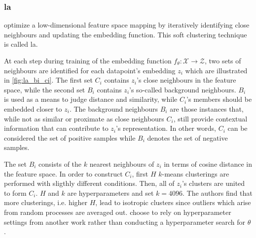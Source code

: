 \subsubsection{\acl{la}}\label{subsec:local_aggregation}


\citet{local_aggr_2019} optimize a low-dimensional feature space mapping by 
iteratively identifying close neighbours and updating the embedding function.
This soft clustering technique is called \ac{la}.

At each step during training of the embedding function $f_\theta: \mathcal{X} \rightarrow \mathcal{Z}$, 
two sets of neighbours are identified for each datapoint's embedding $z_i$ 
which are illustrated in \autoref{fig:la_bi_ci}.
The first set $C_i$ contains $z_i$'s close neighbours in the feature space, while
the second set $B_i$ contains $z_i$'s so-called background neighbours.
$B_i$ is used as a means to judge distance and similarity, 
while $C_i$'s members should be embedded closer to $z_i$.
The background neighbours $B_i$ are those instances that, 
while not as similar or proximate as close neighbours $C_i$, 
still provide contextual information that can contribute 
to $z_i$'s representation. 
In other words, $C_i$ can be considered the set of positive samples while 
$B_i$ denotes the set of negative samples.

The set $B_i$ consists of the $k$ nearest neighbours of $z_i$ in terms of cosine distance 
in the feature space.
In order to construct $C_i$, 
first $H$ $k$-means clusterings are performed with sligthly different conditions.
Then, all of $z_i$'s clusters are united to form $C_i$.
$H$ and $k$ are hyperparameters and \citet{local_aggr_2019} set $k=4096$.
The authors find that more clusterings, i.e. higher $H$, lead to isotropic clusters since outliers which arise from random processes are averaged out.
\citet{local_aggr_2019} choose to rely on hyperparameter settings from another work rather than conducting a hyperparameter search for $\theta$.


